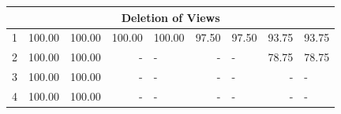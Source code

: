 \begin{table}[t]
\begin{tabular}{l r l r l r l r l}
		\multicolumn{9}{c}{\textbf{Deletion of Views}} \\ \hline
		1 & 100.00 \hspace{0.5cm} & 100.00 & 100.00 \hspace{0.5cm} & 100.00 & 97.50 \hspace{0.5cm} & 97.50 & 93.75 \hspace{0.5cm} & 93.75 \\ 
		2 & 100.00 \hspace{0.5cm} & 100.00 & - \hspace{0.5cm} & - & - \hspace{0.5cm} & - & 78.75 \hspace{0.5cm} & 78.75 \\ 
		3 & 100.00 \hspace{0.5cm} & 100.00 & - \hspace{0.5cm} & - & - \hspace{0.5cm} & - & - \hspace{0.5cm} & - \\ 
		4 & 100.00 \hspace{0.5cm} & 100.00 & - \hspace{0.5cm} & - & - \hspace{0.5cm} & - & - \hspace{0.5cm} & - \\ \hline
	
	\end{tabular}
\end{table}

